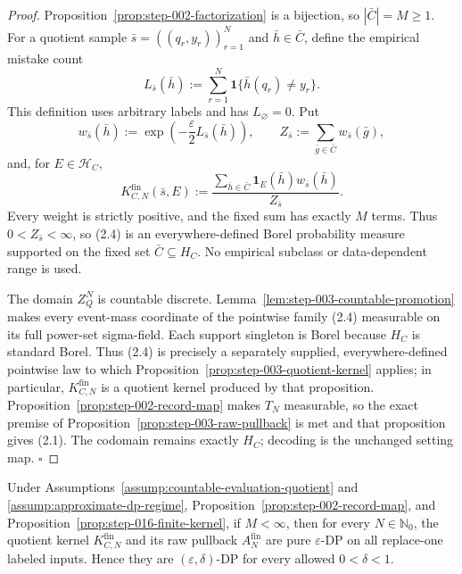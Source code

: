 \begin{proof}
Proposition~\ref{prop:step-002-factorization} is a
bijection, so \(|\bar C|=M\ge1\). For a quotient sample
\(\bar s=((q_r,y_r))_{r=1}^N\) and \(\bar h\in\bar C\), define the
empirical mistake count
\[
L_{\bar s}(\bar h)
:=\sum_{r=1}^N\mathbf 1\{\bar h(q_r)\ne y_r\}.
\tag{2.2}
\]
This definition uses arbitrary labels and has \(L_\varnothing=0\). Put
\[
w_{\bar s}(\bar h):=
\exp\!\left(-\frac{\varepsilon}{2}L_{\bar s}(\bar h)\right),
\qquad
Z_{\bar s}:=\sum_{\bar g\in\bar C}w_{\bar s}(\bar g),
\tag{2.3}
\]
and, for \(E\in\mathcal H_C\),
\[
K^{\mathrm{fin}}_{C,N}(\bar s,E)
:=\frac{\displaystyle
\sum_{\bar h\in\bar C}\mathbf1_E(\bar h)w_{\bar s}(\bar h)}
{Z_{\bar s}}.
\tag{2.4}
\]
Every weight is strictly positive, and the fixed sum has exactly \(M\)
terms. Thus \(0<Z_{\bar s}<\infty\), so (2.4) is an everywhere-defined
Borel probability measure supported on the fixed set \(\bar C\subseteq H_C\).
No empirical subclass or data-dependent range is used.

The domain \(Z_Q^N\) is countable discrete. Lemma~\ref{lem:step-003-countable-promotion} makes every event-mass coordinate
of the pointwise family (2.4) measurable on its full power-set sigma-field.
Each support singleton is Borel because \(H_C\) is standard Borel. Thus
(2.4) is precisely a separately supplied, everywhere-defined pointwise law
to which Proposition~\ref{prop:step-003-quotient-kernel} applies;
in particular, \(K^{\mathrm{fin}}_{C,N}\) is a quotient kernel produced by
that proposition. Proposition~\ref{prop:step-002-record-map} makes
\(T_N\) measurable, so the exact premise of Proposition~\ref{prop:step-003-raw-pullback} is met and that proposition gives
(2.1). The codomain remains exactly \(H_C\); decoding is the unchanged
setting map. \(\square\)


\end{proof}

\begin{proposition}\label{prop:step-016-finite-dp}
Under Assumptions~\ref{assump:countable-evaluation-quotient} and
\ref{assump:approximate-dp-regime}, Proposition~\ref{prop:step-002-record-map}, and
Proposition~\ref{prop:step-016-finite-kernel}, if \(M<\infty\), then for
every \(N\in\mathbb N_0\), the quotient kernel
\(K^{\mathrm{fin}}_{C,N}\) and its raw pullback
\(A_N^{\mathrm{fin}}\) are pure \(\varepsilon\)-DP on all replace-one
labeled inputs. Hence they are \((\varepsilon,\delta)\)-DP for every allowed
\(0<\delta<1\).


\end{proposition}

